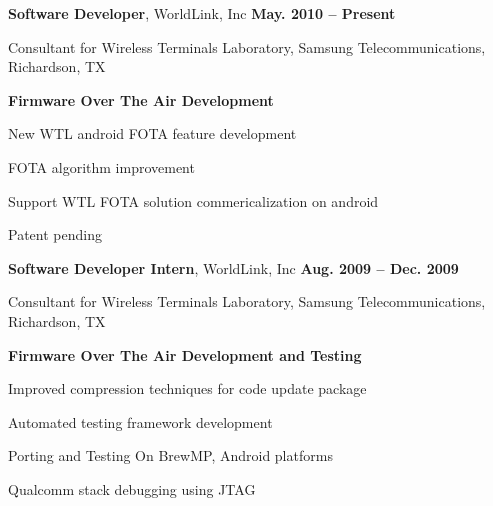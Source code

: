 \documentclass[overlapped, line]{resume}
\begin{document}
\begin{resume}
         {\bf Software Developer}, WorldLink, Inc \hfill {\bf May. 2010 -- Present}\\
         \vspace{-10pt}      %
         \begin{list2}
         \item Consultant for Wireless Terminals Laboratory, Samsung Telecommunications, Richardson, TX
         \item \textbf{Firmware Over The Air Development}
           \begin{list2}
           \item New WTL android FOTA feature development
           \item FOTA algorithm improvement
           \item Support WTL FOTA solution commericalization on android
           \begin{list2}
           \item Patent pending
           \end{list2}
           \end{list2}
         \end{list2}  \vspace{-5pt}

         {\bf Software Developer Intern}, WorldLink, Inc \hfill {\bf Aug. 2009 -- Dec. 2009}\\
         \vspace{-10pt}      %
         \begin{list2}
         \item Consultant for Wireless Terminals Laboratory, Samsung Telecommunications, Richardson, TX
         \item \textbf{Firmware Over The Air Development and Testing}
           \begin{list2}
           \item Improved compression techniques for code update package
           \item Automated testing framework development
           \item Porting and Testing On BrewMP, Android platforms
           \item Qualcomm stack debugging using JTAG
           \end{list2}

         \end{list2}  \vspace{-5pt}



\end{resume}
\end{document}
